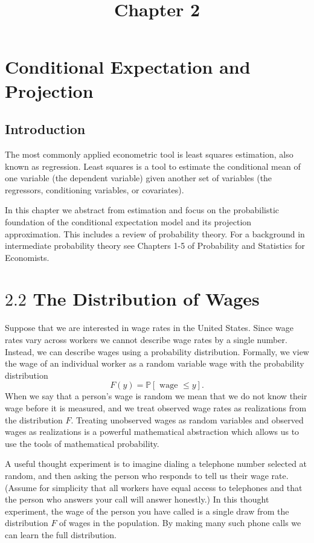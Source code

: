 \documentclass[10pt]{article}
\title{Chapter 2 }
\author{}
\date{}
\begin{document}
\maketitle
\section{Conditional Expectation and Projection}
\subsection{Introduction}
The most commonly applied econometric tool is least squares estimation, also known as regression. Least squares is a tool to estimate the conditional mean of one variable (the dependent variable) given another set of variables (the regressors, conditioning variables, or covariates).

In this chapter we abstract from estimation and focus on the probabilistic foundation of the conditional expectation model and its projection approximation. This includes a review of probability theory. For a background in intermediate probability theory see Chapters 1-5 of Probability and Statistics for Economists.

\section{$2.2$ The Distribution of Wages}
Suppose that we are interested in wage rates in the United States. Since wage rates vary across workers we cannot describe wage rates by a single number. Instead, we can describe wages using a probability distribution. Formally, we view the wage of an individual worker as a random variable wage with the probability distribution
$$
F(y)=\mathbb{P}[\text { wage } \leq y] .
$$
When we say that a person's wage is random we mean that we do not know their wage before it is measured, and we treat observed wage rates as realizations from the distribution $F$. Treating unobserved wages as random variables and observed wages as realizations is a powerful mathematical abstraction which allows us to use the tools of mathematical probability.

A useful thought experiment is to imagine dialing a telephone number selected at random, and then asking the person who responds to tell us their wage rate. (Assume for simplicity that all workers have equal access to telephones and that the person who answers your call will answer honestly.) In this thought experiment, the wage of the person you have called is a single draw from the distribution $F$ of wages in the population. By making many such phone calls we can learn the full distribution.
\end{document}
